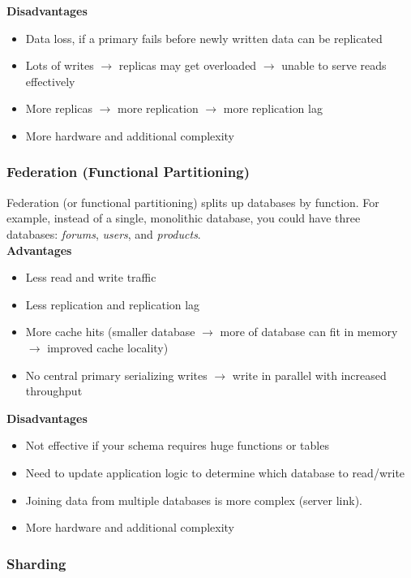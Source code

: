 \documentclass[12pt, titlepage]{article}
\begin{document}
\textbf{Disadvantages}
\begin{itemize}
  \item Data loss, if a primary fails before newly written data can be replicated
  \item Lots of writes $\rightarrow$ replicas may get overloaded $\rightarrow$ unable to serve reads effectively
  \item More replicas $\rightarrow$ more replication $\rightarrow$ more replication lag
  \item More hardware and additional complexity
\end{itemize}

\subsubsection{Federation (Functional Partitioning)}

Federation (or functional partitioning) splits up databases by function. For example, instead of a single, monolithic database, you could have three databases: \textit{forums}, \textit{users}, and \textit{products}. \\

\textbf{Advantages}
\begin{itemize}
  \item Less read and write traffic
  \item Less replication and replication lag
  \item More cache hits (smaller database $\rightarrow$ more of database can fit in memory $\rightarrow$ improved cache locality)
  \item No central primary serializing writes $\rightarrow$ write in parallel with increased throughput \\
\end{itemize}

\textbf{Disadvantages}
\begin{itemize}
  \item Not effective if your schema requires huge functions or tables
  \item Need to update application logic to determine which database to read/write
  \item Joining data from multiple databases is more complex (server link).
  \item More hardware and additional complexity
\end{itemize}

\subsubsection{Sharding}
\end{document}
